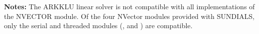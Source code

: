 \documentclass[letterpaper,10pt,english]{sphinxmanual}
\begin{document}
\begin{fulllineitems}
\begin{description}
\begin{itemize}
\end{itemize}

\end{description}

\textbf{Notes:}  The ARKKLU linear solver is not compatible with all
implementations of the NVECTOR module. Of the four NVector
modules provided with SUNDIALS, only the serial and threaded
modules ({\hyperref[nvectors/NVector_Serial:nvectors-nvserial]{\emph{}}}, {\hyperref[nvectors/NVector_OpenMP:nvectors-openmp]{\emph{}}} and
{\hyperref[nvectors/NVector_Pthreads:nvectors-pthreads]{\emph{}}}) are compatible.

\end{fulllineitems}

\end{document}
